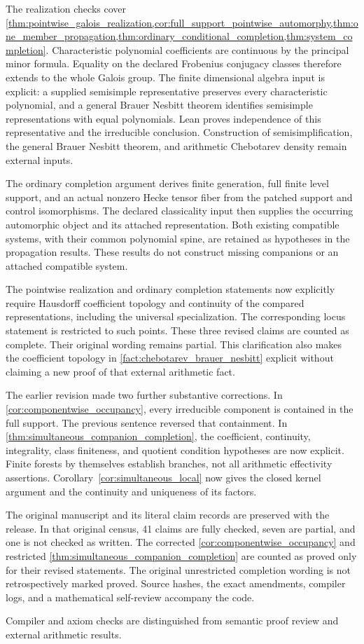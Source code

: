 \documentclass[11pt]{amsart}
\theoremstyle{definition}
\theoremstyle{remark}
\begin{document}
The realization checks cover \cref{thm:pointwise_galois_realization,cor:full_support_pointwise_automorphy,thm:one_member_propagation,thm:ordinary_conditional_completion,thm:system_completion}. Characteristic polynomial coefficients are continuous by the principal minor formula. Equality on the declared Frobenius conjugacy classes therefore extends to the whole Galois group. The finite dimensional algebra input is explicit: a supplied semisimple representative preserves every characteristic polynomial, and a general Brauer Nesbitt theorem identifies semisimple representations with equal polynomials. Lean proves independence of this representative and the irreducible conclusion. Construction of semisimplification, the general Brauer Nesbitt theorem, and arithmetic Chebotarev density remain external inputs.

The ordinary completion argument derives finite generation, full finite level support, and an actual nonzero Hecke tensor fiber from the patched support and control isomorphisms. The declared classicality input then supplies the occurring automorphic object and its attached representation. Both existing compatible systems, with their common polynomial spine, are retained as hypotheses in the propagation results. These results do not construct missing companions or an attached compatible system.

The pointwise realization and ordinary completion statements now explicitly require Hausdorff coefficient topology and continuity of the compared representations, including the universal specialization. The corresponding locus statement is restricted to such points. These three revised claims are counted as complete. Their original wording remains partial. This clarification also makes the coefficient topology in \cref{fact:chebotarev_brauer_nesbitt} explicit without claiming a new proof of that external arithmetic fact.

The earlier revision made two further substantive corrections. In \cref{cor:componentwise_occupancy}, every irreducible component is contained in the full support. The previous sentence reversed that containment. In \cref{thm:simultaneous_companion_completion}, the coefficient, continuity, integrality, class finiteness, and quotient condition hypotheses are now explicit. Finite forests by themselves establish branches, not all arithmetic effectivity assertions. Corollary~\ref{cor:simultaneous_local} now gives the closed kernel argument and the continuity and uniqueness of its factors.

The original manuscript and its literal claim records are preserved with the release. In that original census, 41 claims are fully checked, seven are partial, and one is not checked as written. The corrected \cref{cor:componentwise_occupancy} and restricted \cref{thm:simultaneous_companion_completion} are counted as proved only for their revised statements. The original unrestricted completion wording is not retrospectively marked proved. Source hashes, the exact amendments, compiler logs, and a mathematical self-review accompany the code.

Compiler and axiom checks are distinguished from semantic proof review and external arithmetic results.



\end{document}
